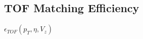 \subsection{TOF Matching Efficiency}\label{section:star_TOFeffi}
$\epsilon_{TOF}\left(p_T,\eta,V_{z}\right)$